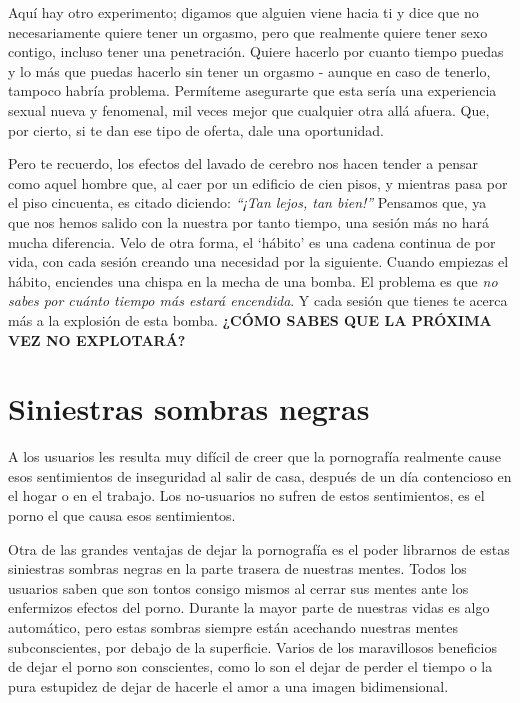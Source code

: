 \documentclass[
  spanish,
  openany]{book}
\begin{document}
Aquí hay otro experimento; digamos que alguien viene hacia ti y dice que no necesariamente quiere tener un orgasmo, pero que realmente quiere tener sexo contigo, incluso tener una penetración. Quiere hacerlo por cuanto tiempo puedas y lo más que puedas hacerlo sin tener un orgasmo - aunque en caso de tenerlo, tampoco habría problema. Permíteme asegurarte que esta sería una experiencia sexual nueva y fenomenal, mil veces mejor que cualquier otra allá afuera. Que, por cierto, si te dan ese tipo de oferta, dale una oportunidad.

Pero te recuerdo, los efectos del lavado de cerebro nos hacen tender a pensar como aquel hombre que, al caer por un edificio de cien pisos, y mientras pasa por el piso cincuenta, es citado diciendo: \emph{``¡Tan lejos, tan bien!''} Pensamos que, ya que nos hemos salido con la nuestra por tanto tiempo, una sesión más no hará mucha diferencia. Velo de otra forma, el `hábito' es una cadena continua de por vida, con cada sesión creando una necesidad por la siguiente. Cuando empiezas el hábito, enciendes una chispa en la mecha de una bomba. El problema es que \emph{no sabes por cuánto tiempo más estará encendida}. Y cada sesión que tienes te acerca más a la explosión de esta bomba. \textbf{¿CÓMO SABES QUE LA PRÓXIMA VEZ NO EXPLOTARÁ?}

\hypertarget{siniestras-sombras-negras}{%
\section{Siniestras sombras negras}\label{siniestras-sombras-negras}}

A los usuarios les resulta muy difícil de creer que la pornografía realmente cause esos sentimientos de inseguridad al salir de casa, después de un día contencioso en el hogar o en el trabajo. Los no-usuarios no sufren de estos sentimientos, es el porno el que causa esos sentimientos.

Otra de las grandes ventajas de dejar la pornografía es el poder librarnos de estas siniestras sombras negras en la parte trasera de nuestras mentes. Todos los usuarios saben que son tontos consigo mismos al cerrar sus mentes ante los enfermizos efectos del porno. Durante la mayor parte de nuestras vidas es algo automático, pero estas sombras siempre están acechando nuestras mentes subconscientes, por debajo de la superficie. Varios de los maravillosos beneficios de dejar el porno son conscientes, como lo son el dejar de perder el tiempo o la pura estupidez de dejar de hacerle el amor a una imagen bidimensional.
\end{document}
